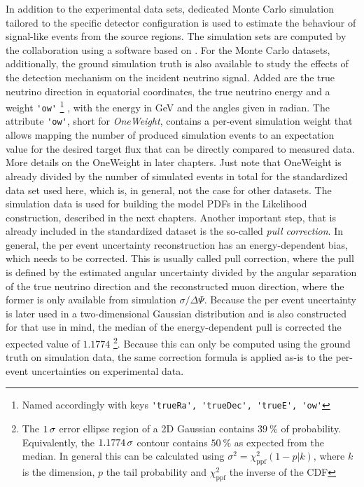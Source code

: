 In addition to the experimental data sets, dedicated Monte Carlo simulation tailored to the specific detector configuration is used to estimate the behaviour of signal-like events from the source regions.
The simulation sets are computed by the collaboration using a software based on .
For the Monte Carlo datasets, additionally, the ground simulation truth is also available to study the effects of the detection mechanism on the incident neutrino signal.
Added are the true neutrino direction in equatorial coordinates, the true neutrino energy and a weight \lstinline!'ow'! \footnote{Named accordingly with keys \lstinline!'trueRa', 'trueDec', 'trueE', 'ow'!} , with the energy in GeV and the angles given in radian.
The attribute \lstinline!'ow'!, short for \emph{OneWeight}, contains a per-event simulation weight that allows mapping the number of produced simulation events to an expectation value for the desired target flux that can be directly compared to measured data.
More details on the OneWeight in later chapters.
Just note that OneWeight is already divided by the number of simulated events in total for the standardized data set used here, which is, in general, not the case for other datasets.
The simulation data is used for building the model PDFs in the Likelihood construction, described in the next chapters.
Another important step, that is already included in the standardized dataset is the so-called \emph{pull correction}.
In general, the per event uncertainty reconstruction has an energy-dependent bias, which needs to be corrected.
This is usually called pull correction, where the pull is defined by the estimated angular uncertainty divided by the angular separation of the true neutrino direction and the reconstructed muon direction, where the former is only available from simulation $\sigma / \Delta\Psi$.
Because the per event uncertainty is later used in a two-dimensional Gaussian distribution and is also constructed for that use in mind, the median of the energy-dependent pull is corrected the expected value of $\num{1.1774}$ \footnote{The $\num{1}\,\sigma$ error ellipse region of a 2D Gaussian contains $\SI{39}{\percent}$ of probability. Equivalently, the $\num{1.1774}\,\sigma$ contour contains $\SI{50}{\percent}$ as expected from the median. In general this can be calculated using $\sigma^2 = \chi^2_\text{ppf}(1-p|k)$, where $k$ is the dimension, $p$ the tail probability and $\chi^2_\text{ppf}$ the inverse of the CDF }.
Because this can only be computed using the ground truth on simulation data, the same correction formula is applied as-is to the per-event uncertainties on experimental data.

